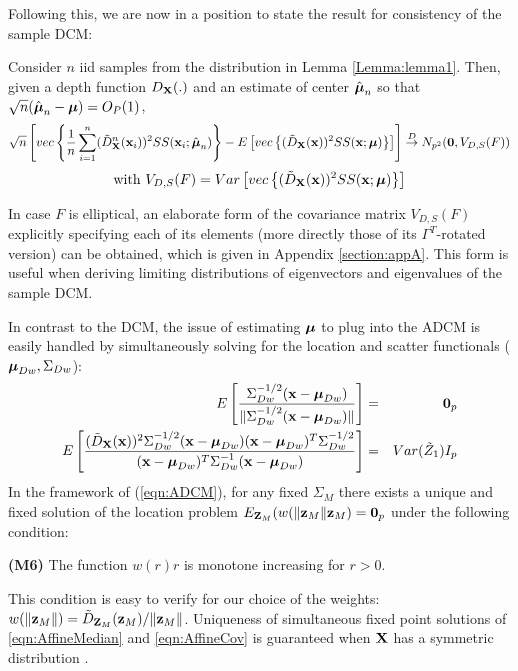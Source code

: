 \documentclass[fleqn,11pt]{article}
\begin{document}
Following this, we are now in a position to state the result for consistency of the sample DCM:

\begin{Theorem} \label{Theorem:rootn}
Consider $n$ iid samples from the distribution in Lemma \ref{Lemma:lemma1}. Then, given a depth function $D_{\mathbf{X}}(.)$ and an estimate of center $\hat{{\boldsymbol{\mu}}}_n$ so that $\sqrt n(\hat {{\boldsymbol{\mu}}}_n - {\boldsymbol{\mu}}) = O_P(1)$,
%
$$ \sqrt n \left[ vec\left\{ \frac{1}{n} \sum_{i=1}^n (\tilde D^n_{\mathbf{X}} ({\bf{x}}_i))^2 SS({\bf{x}}_i; \hat{{\boldsymbol{\mu}}}_n) \right\} - E \left[ vec\left\{ (\tilde D_{\mathbf{X}} ({\bf{x}}))^2 SS({\bf{x}}; {\boldsymbol{\mu}}) \right\} \right] \right]
\stackrel{D}{\rightarrow}
N_{p^2} ({\bf 0}, V_{D,S}(F)) $$
$$ \text{with } V_{D,S}(F) = Var \left[vec \left\{ (\tilde D_{\mathbf{X}} ({\bf{x}}))^2 SS({\bf{x}}; {\boldsymbol{\mu}}) \right\} \right] $$
\end{Theorem}

\noindent In case $F$ is elliptical, an elaborate form of the covariance matrix $V_{D,S}(F)$ explicitly specifying each of its elements (more directly those of its $\Gamma^T$-rotated version) can be obtained, which is given in Appendix \ref{section:appA}. This form is useful when deriving limiting distributions of eigenvectors and eigenvalues of the sample DCM.

In contrast to the DCM, the issue of estimating ${\boldsymbol{\mu}}$ to plug into the ADCM is easily handled by simultaneously solving for the location and scatter functionals (${\boldsymbol{\mu}}_{Dw}, \Sigma_{Dw}$):
%
\begin{eqnarray}
E \left[ \frac{\Sigma_{Dw}^{-1/2} ({\bf{x}} - {\boldsymbol{\mu}}_{Dw})}{ \| \Sigma_{Dw}^{-1/2}({\bf{x}} - {\boldsymbol{\mu}}_{Dw}) \|} \right] &=& {\bf 0}_p \label{eqn:AffineMedian}\\
E \left[ \frac{(\tilde D_{\mathbf{X}}({\bf{x}}))^2 \Sigma_{Dw}^{-1/2} ({\bf{x}} - {\boldsymbol{\mu}}_{Dw}) ({\bf{x}} - {\boldsymbol{\mu}}_{Dw})^T \Sigma_{Dw}^{-1/2}}{({\bf{x}} - {\boldsymbol{\mu}}_{Dw})^T \Sigma_{Dw}^{-1} ({\bf{x}} - {\boldsymbol{\mu}}_{Dw})} \right] &=& Var (\tilde Z_1) I_p \label{eqn:AffineCov}
\end{eqnarray}
%
In the framework of (\ref{eqn:ADCM}), for any fixed $\Sigma_M$ there exists a unique and fixed solution of the location problem $E_{{\mathbf{Z}}_M} (w(\| {\bf{z}}_M \| {\bf{z}}_M) = {\bf 0}_p $ under the following condition:

\vspace{1em}
\noindent\textbf{(M6)} The function $w(r)r$ is monotone increasing for $r>0$.

\vspace{1em}
\noindent This condition is easy to verify for our choice of the weights: $w(\| {\bf{z}}_M \| ) = \tilde D_{{\mathbf{Z}}_M} ({\bf{z}}_M) / \| {\bf{z}}_M \|$. Uniqueness of simultaneous fixed point solutions of \ref{eqn:AffineMedian} and \ref{eqn:AffineCov} is guaranteed when ${\mathbf{X}}$ has a symmetric distribution \citep{HuberBook81}.
\end{document}
